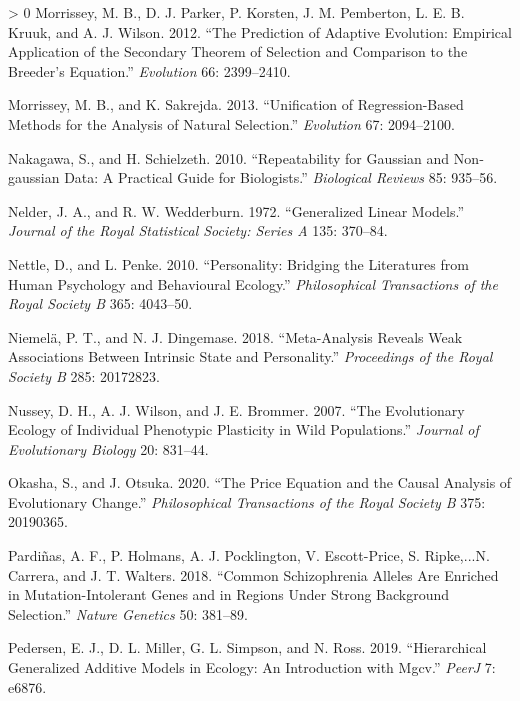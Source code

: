\documentclass{article}
\newlength{\cslhangindent}
\newenvironment{CSLReferences}[3] %
 {%
  \setlength{\parindent}{0pt}
  \ifodd #1 \everypar{\setlength{\hangindent}{\cslhangindent}}\ignorespaces\fi
  \ifnum #2 > 0
  \setlength{\parskip}{#2\baselineskip}
  \fi
 }%
 {}
\begin{document}
\begin{CSLReferences}{1}{0}
\leavevmode\hypertarget{ref-Morrissey2012}{}%
Morrissey, M. B., D. J. Parker, P. Korsten, J. M. Pemberton, L. E. B.
Kruuk, and A. J. Wilson. 2012. {``The Prediction of Adaptive Evolution:
Empirical Application of the Secondary Theorem of Selection and
Comparison to the Breeder's Equation.''} \emph{Evolution} 66:
2399--2410.

\leavevmode\hypertarget{ref-Morrissey2013}{}%
Morrissey, M. B., and K. Sakrejda. 2013. {``Unification of
Regression-Based Methods for the Analysis of Natural Selection.''}
\emph{Evolution} 67: 2094--2100.

\leavevmode\hypertarget{ref-Naka2010}{}%
Nakagawa, S., and H. Schielzeth. 2010. {``Repeatability for Gaussian and
Non‐gaussian Data: A Practical Guide for Biologists.''} \emph{Biological
Reviews} 85: 935--56.

\leavevmode\hypertarget{ref-Nelder1972}{}%
Nelder, J. A., and R. W. Wedderburn. 1972. {``Generalized Linear
Models.''} \emph{Journal of the Royal Statistical Society: Series A}
135: 370--84.

\leavevmode\hypertarget{ref-Nettle2010}{}%
Nettle, D., and L. Penke. 2010. {``Personality: Bridging the Literatures
from Human Psychology and Behavioural Ecology.''} \emph{Philosophical
Transactions of the Royal Society B} 365: 4043--50.

\leavevmode\hypertarget{ref-Niem2018}{}%
Niemelä, P. T., and N. J. Dingemase. 2018. {``Meta-Analysis Reveals Weak
Associations Between Intrinsic State and Personality.''}
\emph{Proceedings of the Royal Society B} 285: 20172823.

\leavevmode\hypertarget{ref-Nus2007}{}%
Nussey, D. H., A. J. Wilson, and J. E. Brommer. 2007. {``The
Evolutionary Ecology of Individual Phenotypic Plasticity in Wild
Populations.''} \emph{Journal of Evolutionary Biology} 20: 831--44.

\leavevmode\hypertarget{ref-Okasha2020}{}%
Okasha, S., and J. Otsuka. 2020. {``The Price Equation and the Causal
Analysis of Evolutionary Change.''} \emph{Philosophical Transactions of
the Royal Society B} 375: 20190365.

\leavevmode\hypertarget{ref-Pard2018}{}%
Pardiñas, A. F., P. Holmans, A. J. Pocklington, V. Escott-Price, S.
Ripke,...N. Carrera, and J. T. Walters. 2018. {``Common Schizophrenia
Alleles Are Enriched in Mutation-Intolerant Genes and in Regions Under
Strong Background Selection.''} \emph{Nature Genetics} 50: 381--89.

\leavevmode\hypertarget{ref-Pedersen2019}{}%
Pedersen, E. J., D. L. Miller, G. L. Simpson, and N. Ross. 2019.
{``Hierarchical Generalized Additive Models in Ecology: An Introduction
with Mgcv.''} \emph{PeerJ} 7: e6876.


\end{CSLReferences}
\end{document}
